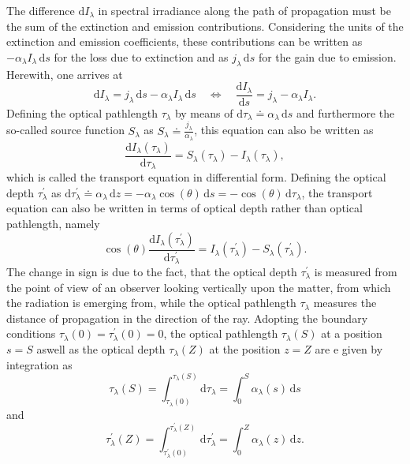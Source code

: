 \documentclass[a4paper,12pt]{report}
\begin{document}
The difference $\mathrm{d}I_\lambda$ in spectral irradiance along the path of propagation must be the sum of the extinction and emission contributions. Considering the units of the extinction and emission coefficients, these contributions can be written as $-\alpha_\lambda I_\lambda \,\mathrm{d}s$ for the loss due to extinction and as $j_\lambda \,\mathrm{d}s$ for the gain due to emission. Herewith, one arrives at \begin{equation}
\mathrm{d}I_\lambda = j_\lambda\,\mathrm{d}s - \alpha_\lambda I_\lambda\,\mathrm{d}s \quad \Leftrightarrow \quad \frac{\mathrm{d}I_\lambda}{\mathrm{d}s} = j_\lambda - \alpha_\lambda I_\lambda.
\end{equation} Defining the optical pathlength $\tau_\lambda$ by means of $\mathrm{d}\tau_\lambda \doteq \alpha_\lambda \,\mathrm{d}s$ and furthermore the so-called source function $S_\lambda$ as $S_\lambda \doteq \frac{j_\lambda}{\alpha_\lambda}$, this equation can also be written as \begin{equation}\label{eq:transportequationdiffform_opt_pathlength}
\frac{\mathrm{d}I_\lambda(\tau_\lambda)}{\mathrm{d}\tau_\lambda} = S_\lambda(\tau_\lambda) - I_\lambda(\tau_\lambda),
\end{equation} which is called the transport equation in differential form. Defining the optical depth $\tau^\prime_\lambda$ as $\mathrm{d}\tau^\prime_\lambda \doteq \alpha_\lambda\,\mathrm{d}z = -\alpha_\lambda \cos(\theta)\,\mathrm{d}s = -\cos(\theta)\,\mathrm{d}\tau_\lambda$, the transport equation can also be written in terms of optical depth rather than optical pathlength, namely \begin{equation}\label{eq:transportequationdiffform_opt_depth}
\cos(\theta)\frac{\mathrm{d}I_\lambda(\tau^\prime_\lambda)}{\mathrm{d}\tau^\prime_\lambda} = I_\lambda(\tau^\prime_\lambda) - S_\lambda(\tau^\prime_\lambda).
\end{equation} The change in sign is due to the fact, that the optical depth $\tau^\prime_\lambda$ is measured from the point of view of an observer looking vertically upon the matter, from which the radiation is emerging from, while the optical pathlength $\tau_\lambda$ measures the distance of propagation in the direction of the ray. Adopting the boundary conditions $\tau_\lambda(0) = \tau_\lambda^\prime(0) = 0$, the optical pathlength $\tau_\lambda(S)$ at a position $s=S$ aswell as the optical depth $\tau_\lambda(Z)$ at the position $z=Z$ are e given by integration as \begin{equation}
\tau_\lambda(S) = \int_{\tau_\lambda(0)}^{\tau_\lambda(S)} \mathrm{d}\tau_\lambda = \int_{0}^{S}\alpha_\lambda (s)\,\mathrm{d}s
\end{equation} and 
\begin{equation}
\tau_\lambda^\prime(Z) = \int_{\tau_\lambda^\prime(0)}^{\tau_\lambda^\prime(Z)}\,\mathrm{d}\tau_\lambda^\prime = \int_{0}^{Z} \alpha_\lambda(z)\,\mathrm{d}z.
\end{equation}
\end{document}
